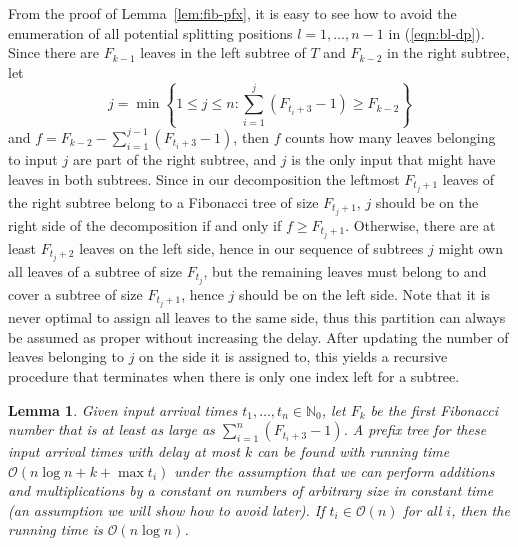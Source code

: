 \documentclass[11pt,final,microtype]{scrartcl}
\theoremstyle{plain}
\newtheorem{lemma}[theorem]{Lemma}
\theoremstyle{definition}
\theoremstyle{remark}
\begin{document}
From the proof of Lemma~\ref{lem:fib-pfx}, it is easy to see how to
avoid the enumeration of all potential splitting positions
$l=1,\dots,n-1$ in (\ref{eqn:bl-dp}). Since there are $F_{k-1}$ leaves
in the left subtree of $T$ and $F_{k-2}$ in the right subtree, let $$j
= \min \left\{1 \leq j \leq n : \sum_{i = 1}^{j} (F_{t_i + 3} - 1)
  \geq F_{k-2}\right\}$$ and $f = F_{k-2} - \sum_{i = 1}^{j-1} (F_{t_i
  + 3} - 1)$, then $f$ counts how many leaves belonging to input $j$
are part of the right subtree, and $j$ is the only input that might
have leaves in both subtrees. Since in our decomposition the leftmost
$F_{t_j+1}$ leaves of the right subtree belong to a Fibonacci tree of
size $F_{t_j+1}$, $j$ should be on the right side of the decomposition
if and only if $f \geq F_{t_j+1}$. Otherwise, there are at least
$F_{t_j+2}$ leaves on the left side, hence in our sequence of subtrees
$j$ might own all leaves of a subtree of size $F_{t_j}$, but the
remaining leaves must belong to and cover a subtree of size
$F_{t_j+1}$, hence $j$ should be on the left side. Note that it is
never optimal to assign all leaves to the same side, thus this
partition can always be assumed as proper without increasing the
delay. After updating the number of leaves belonging to $j$ on the
side it is assigned to, this yields a recursive procedure that
terminates when there is only one index left for a subtree.

\begin{lemma}\label{lem:fast-bl}
  Given input arrival times $t_1, \dots, t_n \in \mathbb{N}_0$, let
  $F_{k}$ be the first Fibonacci number that is at least as large as
  $\sum_{i=1}^{n} (F_{t_i + 3} - 1)$. A prefix tree for these input
  arrival times with delay at most $k$ can be found with running time
  $\mathcal{O}\left(n \log n + k + \max t_i\right)$ under the
  assumption that we can perform additions and multiplications by a
  constant on numbers of arbitrary size in constant time (an
  assumption we will show how to avoid later). If $t_i \in
  \mathcal{O}(n)$ for all $i$, then the running time is
  $\mathcal{O}(n\log n)$.
\end{lemma}
\end{document}
